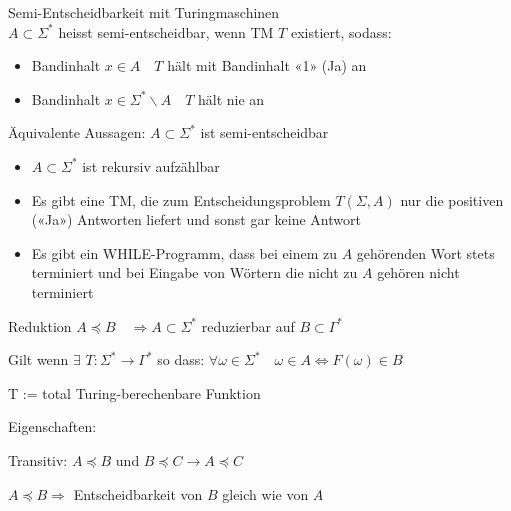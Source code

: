 \begin{concept}{Semi-Entscheidbarkeit mit Turingmaschinen}\\
    $A \subset \Sigma^{*}$ heisst semi-entscheidbar, wenn TM $T$ existiert, sodass:

    \begin{itemize}
    \item Bandinhalt $x \in A \quad T$ hält mit Bandinhalt «1» (Ja) an
    \item Bandinhalt $x \in \Sigma^{*} \backslash A \quad T$ hält nie an
    \end{itemize}

    \vspace{1mm}

    {\small
    Äquivalente Aussagen: $A \subset \Sigma^{*}$ ist semi-entscheidbar
    \begin{itemize}
    \item $A \subset \Sigma^{*}$ ist rekursiv aufzählbar
    \item Es gibt eine TM, die zum Entscheidungsproblem $T(\Sigma, A)$ nur die positiven («Ja») Antworten liefert und sonst gar keine Antwort
    \item Es gibt ein WHILE-Programm, dass bei einem zu $A$ gehörenden Wort stets terminiert und bei Eingabe von Wörtern die nicht zu $A$ gehören nicht terminiert
    \end{itemize}
    }
\end{concept}

\begin{theorem}{Reduktion} $A \preccurlyeq B \quad \Rightarrow A \subset \Sigma^{*}$ reduzierbar auf $B \subset \Gamma^{*}$

    Gilt wenn  $\exists$ $T: \Sigma^{*} \rightarrow \Gamma^{*}$ so dass: $\forall \omega \in \Sigma^{*} \quad \omega \in A \Leftrightarrow F(\omega) \in B$
    
    {\footnotesize T := total Turing-berechenbare Funktion}

    \vspace{1mm}

    Eigenschaften:
    
    Transitiv: $A \preccurlyeq B$ und $B \preccurlyeq C \rightarrow A \preccurlyeq C$

    $A \preccurlyeq B \Rightarrow$ Entscheidbarkeit von $B$ gleich wie von $A$
\end{theorem}

